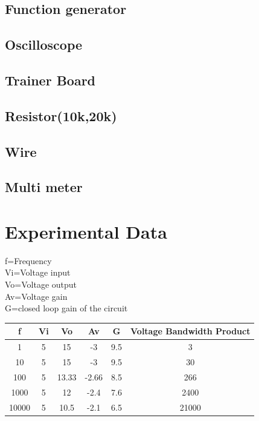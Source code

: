\documentclass[12pt]{article}
\begin{document}
\subsection{Function generator}
\subsection{Oscilloscope}
\subsection{Trainer Board}
\subsection{Resistor(10k,20k)}
\subsection{Wire}
\subsection{Multi meter}
\pagebreak
\section{Experimental Data}
f=Frequency\\
Vi=Voltage input\\
Vo=Voltage output\\
Av=Voltage gain\\
G=closed loop gain of the circuit\\
\begin{center}
\begin{tabular}{|c|c|c|c|c|c|}
    \hline
    f&Vi&Vo&Av&G&Voltage Bandwidth Product\\
    [.4]
    \hline\hline
    1&5&15&-3&9.5&3\\
    \hline
    10&5&15&-3&9.5&30\\
    \hline
    100&5&13.33&-2.66&8.5&266\\
    \hline
    1000&5&12&-2.4&7.6&2400\\
    \hline
    10000&5&10.5&-2.1&6.5&21000\\
    \hline
\end{tabular}
\end{center}
\end{document}
